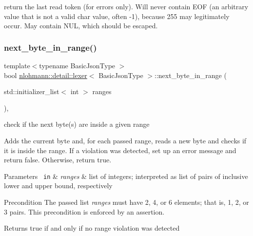 return the last read token (for errors only). Will never contain E\+OF (an arbitrary value that is not a valid char value, often -\/1), because 255 may legitimately occur. May contain N\+UL, which should be escaped. \mbox{\label{classnlohmann_1_1detail_1_1lexer_a2faa544ab5475523ead81f9cdef41a0a}} 
\subsubsection{\texorpdfstring{next\_byte\_in\_range()}{next\_byte\_in\_range()}}
{\footnotesize\ttfamily template$<$typename Basic\+Json\+Type $>$ \\
bool \mbox{\hyperlink{classnlohmann_1_1detail_1_1lexer}{nlohmann\+::detail\+::lexer}}$<$ Basic\+Json\+Type $>$\+::next\+\_\+byte\+\_\+in\+\_\+range (\begin{DoxyParamCaption}\item[{std\+::initializer\+\_\+list$<$ int $>$}]{ranges }\end{DoxyParamCaption})\hspace{0.3cm}{\ttfamily [inline]}, {\ttfamily [private]}}



check if the next byte(s) are inside a given range 

Adds the current byte and, for each passed range, reads a new byte and checks if it is inside the range. If a violation was detected, set up an error message and return false. Otherwise, return true.


\begin{DoxyParams}[1]{Parameters}
\mbox{\texttt{ in}}  & {\em ranges} & list of integers; interpreted as list of pairs of inclusive lower and upper bound, respectively\\
\hline
\end{DoxyParams}
\begin{DoxyPrecond}{Precondition}
The passed list {\itshape ranges} must have 2, 4, or 6 elements; that is, 1, 2, or 3 pairs. This precondition is enforced by an assertion.
\end{DoxyPrecond}
\begin{DoxyReturn}{Returns}
true if and only if no range violation was detected 
\end{DoxyReturn}
\mbox{\label{classnlohmann_1_1detail_1_1lexer_a33e97dee7c5faf1b36aff5b74a6c8f55}} 
